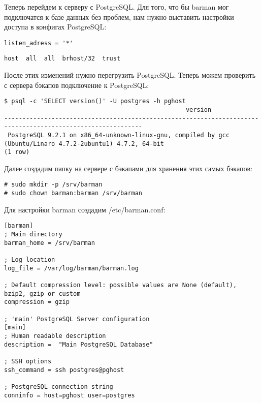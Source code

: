 Теперь перейдем к серверу с PostgreSQL. Для того, что бы barman мог подключатся к базе данных без проблем, нам нужно выставить настройки доступа в конфигах PostgreSQL:

\begin{lstlisting}[label=lst:barman4,caption=Отредактировать в postgresql.conf]
listen_adress = '*'
\end{lstlisting}

\begin{lstlisting}[label=lst:barman5,caption=Добавить в pg\_hba.conf]
host  all  all  brhost/32  trust
\end{lstlisting}

После этих изменений нужно перегрузить PostgreSQL. Теперь можем проверить с сервера бэкапов подключение к PostgreSQL:

\begin{lstlisting}[label=lst:barman6,caption=Проверка подключения к базе]
$ psql -c 'SELECT version()' -U postgres -h pghost
                                                  version                                                   
------------------------------------------------------------------------------------------------------------
 PostgreSQL 9.2.1 on x86_64-unknown-linux-gnu, compiled by gcc (Ubuntu/Linaro 4.7.2-2ubuntu1) 4.7.2, 64-bit
(1 row)
\end{lstlisting}

Далее создадим папку на сервере с бэкапами для хранения этих самых бэкапов:

\begin{lstlisting}[label=lst:barman7,caption=Папка для хранения бэкапов]
# sudo mkdir -p /srv/barman    
# sudo chown barman:barman /srv/barman
\end{lstlisting}

Для настройки barman создадим /etc/barman.conf:

\begin{lstlisting}[label=lst:barman8,caption=barman.conf]
[barman]
; Main directory
barman_home = /srv/barman

; Log location
log_file = /var/log/barman/barman.log

; Default compression level: possible values are None (default), bzip2, gzip or custom
compression = gzip

; 'main' PostgreSQL Server configuration
[main]
; Human readable description
description =  "Main PostgreSQL Database"

; SSH options
ssh_command = ssh postgres@pghost

; PostgreSQL connection string
conninfo = host=pghost user=postgres
\end{lstlisting}

